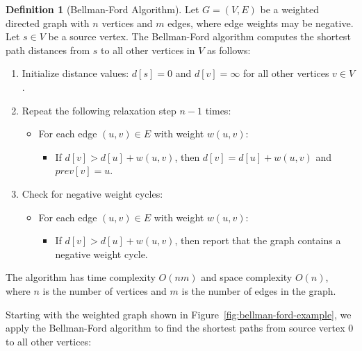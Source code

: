 \documentclass{article}
\theoremstyle{definition}
\newtheorem{definition}{Definition}
\begin{document}
\begin{definition}[Bellman-Ford Algorithm]
Let $G = (V, E)$ be a weighted directed graph with $n$ vertices and $m$ edges, where edge weights may be negative. Let $s \in V$ be a source vertex. The Bellman-Ford algorithm computes the shortest path distances from $s$ to all other vertices in $V$ as follows:

\begin{enumerate}
\item Initialize distance values: $d[s] = 0$ and $d[v] = \infty$ for all other vertices $v \in V$.
\item Repeat the following relaxation step $n-1$ times:
   \begin{itemize}
   \item For each edge $(u,v) \in E$ with weight $w(u,v)$:
      \begin{itemize}
      \item If $d[v] > d[u] + w(u,v)$, then $d[v] = d[u] + w(u,v)$ and $prev[v] = u$.
      \end{itemize}
   \end{itemize}
\item Check for negative weight cycles:
   \begin{itemize}
   \item For each edge $(u,v) \in E$ with weight $w(u,v)$:
      \begin{itemize}
      \item If $d[v] > d[u] + w(u,v)$, then report that the graph contains a negative weight cycle.
      \end{itemize}
   \end{itemize}
\end{enumerate}

The algorithm has time complexity $O(nm)$ and space complexity $O(n)$, where $n$ is the number of vertices and $m$ is the number of edges in the graph.
\end{definition}

Starting with the weighted graph shown in Figure~\ref{fig:bellman-ford-example}, we apply the Bellman-Ford algorithm to find the shortest paths from source vertex 0 to all other vertices:
\end{document}
